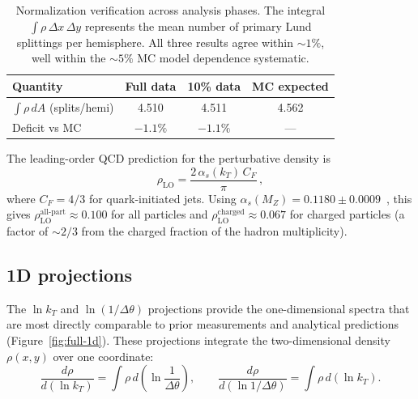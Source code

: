 \documentclass[11pt,a4paper]{article}
\begin{document}
\begin{table}[htbp]
\centering
\caption{Normalization verification across analysis phases.  The integral
  $\int \rho\,\Delta x\,\Delta y$ represents the mean number of primary
  Lund splittings per hemisphere.  All three results agree within
  $\sim\!1\%$, well within the $\sim\!5\%$ MC model dependence systematic.}
\label{tbl:normalization}
\begin{tabular}{lccc}
\toprule
Quantity & Full data & 10\% data & MC expected \\
\midrule
$\int \rho\,dA$ (splits/hemi) & 4.510 & 4.511 & 4.562 \\
Deficit vs MC & $-1.1\%$ & $-1.1\%$ & --- \\
\bottomrule
\end{tabular}
\end{table}

The leading-order QCD prediction for the perturbative density
is~\cite{Dreyer:2018nbf}
\begin{equation}
  \rho_\text{LO} = \frac{2\,\alpha_s(k_T)\,C_F}{\pi}\,,
  \label{eq:rho-lo}
\end{equation}
where $C_F = 4/3$ for quark-initiated jets.  Using
$\alpha_s(M_Z) = 0.1180 \pm 0.0009$~\cite{ParticleDataGroup:2024cfk},
this gives $\rho_\text{LO}^\text{all-part} \approx 0.100$ for all
particles and $\rho_\text{LO}^\text{charged} \approx 0.067$ for charged
particles (a factor of $\sim\!2/3$ from the charged fraction of the
hadron multiplicity).

\subsection{1D projections}
\label{sec:results-1d}

The $\ln k_T$ and $\ln(1/\Delta\theta)$ projections provide the
one-dimensional spectra that are most directly comparable to prior
measurements and analytical predictions (Figure~\ref{fig:full-1d}).
These projections integrate the two-dimensional density $\rho(x,y)$
over one coordinate:
\begin{equation*}
  \frac{d\rho}{d(\ln k_T)} = \int \rho\,d\!\left(\ln\frac{1}{\Delta\theta}\right),
  \qquad
  \frac{d\rho}{d(\ln 1/\Delta\theta)} = \int \rho\,d(\ln k_T).
\end{equation*}
\end{document}
